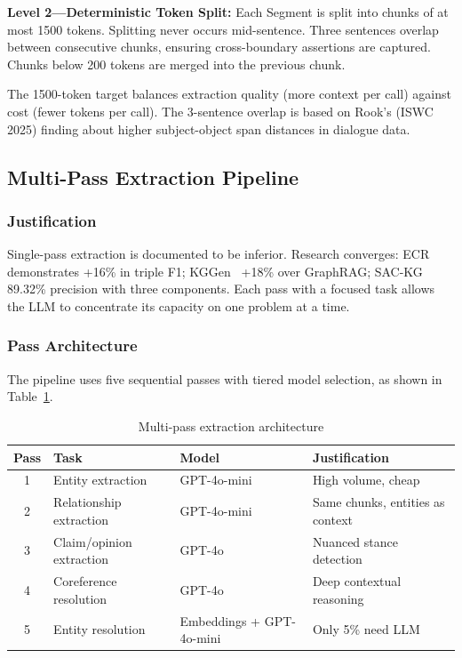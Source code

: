 \textbf{Level 2---Deterministic Token Split:} Each Segment is split into chunks of at most 1500 tokens. Splitting never occurs mid-sentence. Three sentences overlap between consecutive chunks, ensuring cross-boundary assertions are captured. Chunks below 200 tokens are merged into the previous chunk.

The 1500-token target balances extraction quality (more context per call) against cost (fewer tokens per call). The 3-sentence overlap is based on Rook's (ISWC 2025) finding about higher subject-object span distances in dialogue data.

\subsection{Multi-Pass Extraction Pipeline}

\subsubsection{Justification}

Single-pass extraction is documented to be inferior. Research converges: ECR demonstrates +16\% in triple F1; KGGen~\cite{mo2025kggen} +18\% over GraphRAG; SAC-KG~\cite{chen2024sackg} 89.32\% precision with three components. Each pass with a focused task allows the LLM to concentrate its capacity on one problem at a time.

\subsubsection{Pass Architecture}

The pipeline uses five sequential passes with tiered model selection, as shown in Table~\ref{tab:passes}.

\begin{table}[htbp]
\centering
\caption{Multi-pass extraction architecture}
\label{tab:passes}
\begin{tabular}{clll}
\toprule
\textbf{Pass} & \textbf{Task} & \textbf{Model} & \textbf{Justification} \\
\midrule
1 & Entity extraction & GPT-4o-mini & High volume, cheap \\
2 & Relationship extraction & GPT-4o-mini & Same chunks, entities as context \\
3 & Claim/opinion extraction & GPT-4o & Nuanced stance detection \\
4 & Coreference resolution & GPT-4o & Deep contextual reasoning \\
5 & Entity resolution & Embeddings + GPT-4o-mini & Only 5\% need LLM \\
\bottomrule
\end{tabular}
\end{table}

